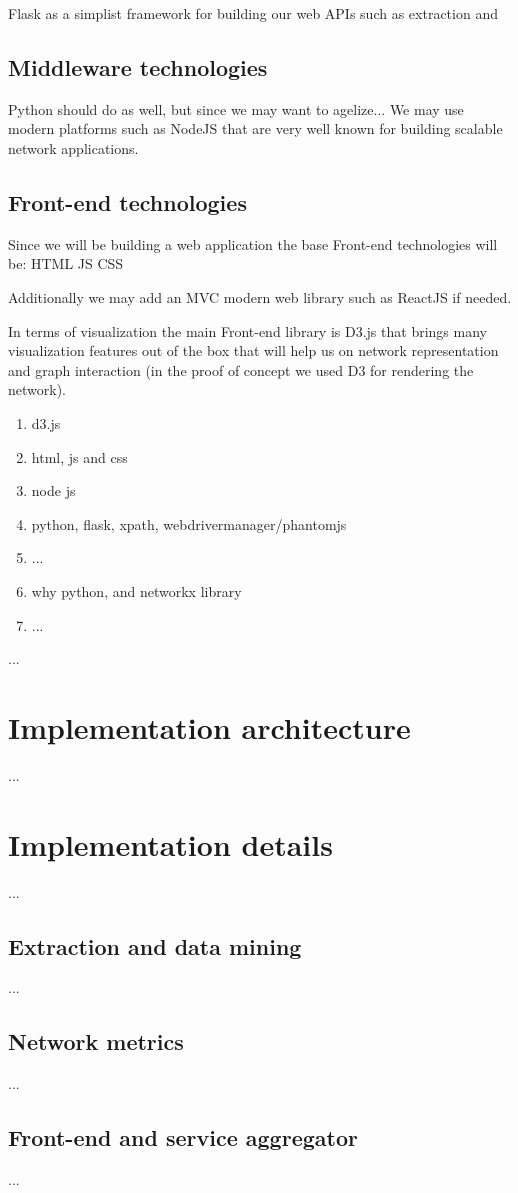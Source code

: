 Flask as a simplist framework for building our web APIs such as extraction and

\subsection{Middleware technologies}
Python should do as well, but since we may want to agelize... We may use modern platforms such as NodeJS that are very well known for
building scalable network applications.

\subsection{Front-end technologies}
Since we will be building a web application the base Front-end technologies will be:
HTML
JS
CSS

Additionally we may add an MVC modern web library such as ReactJS if needed.

In terms of visualization the main Front-end library is D3.js that brings many visualization features out of the box that will help us on
network representation and graph interaction (in the proof of concept we used D3 for rendering the network).

\begin{enumerate}
    \item d3.js
    \item html, js and css
    \item node js
    \item python, flask, xpath, webdrivermanager/phantomjs
    \item ...
    \item why python, and networkx library
    \item ...
\end{enumerate}
...
\section{Implementation architecture}
...
\section{Implementation details}
...
\subsection{Extraction and data mining}
...
\subsection{Network metrics}
...
\subsection{Front-end and service aggregator}
...
